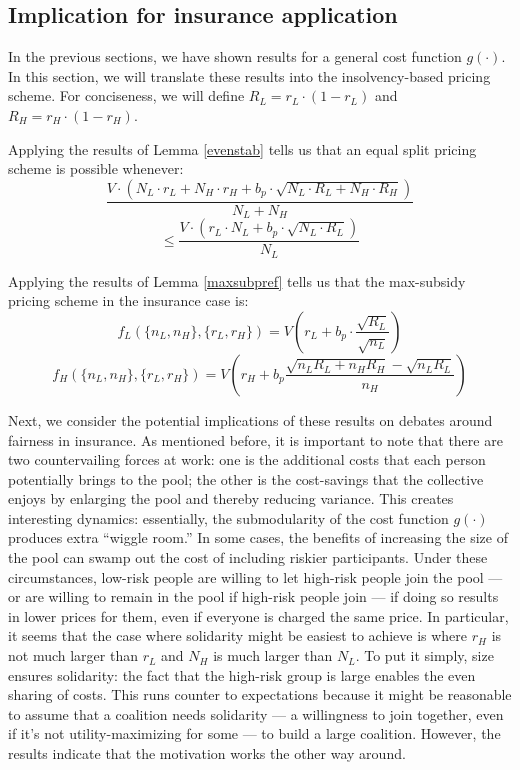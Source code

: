 \documentclass[sigconf]{acmart}
\newcommand{\p}[1]{\left( #1 \right)}
\newcommand{\NL}[0]{\ensuremath{N_L}}
\newcommand{\NH}[0]{\ensuremath{N_H}}
\newcommand{\nL}[0]{\ensuremath{n_L}}
\newcommand{\nH}[0]{\ensuremath{n_H}}
\newcommand{\rL}[0]{\ensuremath{r_L}}
\newcommand{\rH}[0]{\ensuremath{r_H}}
\newcommand{\RL}[0]{\ensuremath{R_L}}
\newcommand{\RH}[0]{\ensuremath{R_H}}
\newcommand{\V}[0]{\ensuremath{V}}
\newcommand{\bp}[0]{\ensuremath{b_p}}
\newcommand{\cost}[0]{\ensuremath{g}}
\newcommand{\priceL}[0]{\ensuremath{f_L}}
\newcommand{\priceH}[0]{\ensuremath{f_H}}
\newcommand{\cd}[0]{\cdot}
\begin{document}
\subsection{Implication for insurance application}
In the previous sections, we have shown results for a general cost function $\cost(\cd)$. In this section, we will translate these results into the insolvency-based pricing scheme. For conciseness, we will define $\RL = \rL \cd (1-\rL)$ and $\RH = \rH \cd (1-\rH)$. 

Applying the results of Lemma \ref{evenstab} tells us that an equal split pricing scheme is possible whenever: 
$$\frac{\V \cd \p{\NL \cd \rL + \NH \cd \rH + \bp \cd \sqrt{\NL \cd \RL + \NH \cd \RH}}}{\NL + \NH} $$
$$\leq \frac{\V\cd \p{\rL \cd \NL + \bp \cd \sqrt{\NL \cd \RL }}}{\NL}$$

Applying the results of Lemma \ref{maxsubpref} tells us that the max-subsidy pricing scheme in the insurance case is:
$$\priceL(\{\nL,\nH \}, \{\rL, \rH\}) = \V \p{\rL  + \bp \cd \frac{\sqrt{\RL}}{\sqrt{\nL}}}$$
$$\priceH(\{\nL,\nH \}, \{\rL, \rH\}) = \V\p{\rH + \bp \frac{\sqrt{\nL \RL + \nH \RH} - \sqrt{\nL \RL}}{\nH}} $$

Next, we consider the potential implications of these results on debates around fairness in insurance. As mentioned before, it is important to note that there are two countervailing forces at work: one is the additional costs that each person potentially brings to the pool; the other is the cost-savings that the collective enjoys by enlarging the pool and thereby reducing variance. This creates interesting dynamics: essentially, the submodularity of the cost function $\cost(\cd)$ produces extra \enquote{wiggle room.} In some cases, the benefits of increasing the size of the pool can swamp out the cost of including riskier participants. Under these circumstances, low-risk people are willing to let high-risk people join the pool --- or are willing to remain in the pool if high-risk people join --- if doing so results in lower prices for them, even if everyone is charged the same price. In particular, it seems that the case where solidarity might be easiest to achieve is where $\rH$ is not much larger than $\rL$ and $\NH$ is much larger than $\NL$. To put it simply, size ensures solidarity: the fact that the high-risk group is large enables the even sharing of costs. This runs counter to expectations because it might be reasonable to assume that a coalition needs solidarity --- a willingness to join together, even if it's not utility-maximizing for some --- to build a large coalition. However, the results indicate that the motivation works the other way around.
\end{document}
